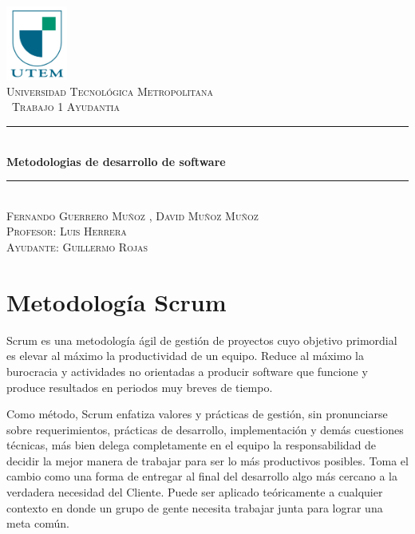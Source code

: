 \documentclass[10pt]{article}
\newcommand{\HRule}{\rule{\linewidth}{0.5mm}}
\begin{document}
\begin{titlepage}
\begin{center}
\includegraphics[width=0.15\textwidth]{Utem}~\\[1cm]

\textsc{\normalsize Universidad Tecnológica Metropolitana}\\[1.5cm]

\textsc{\ Trabajo 1 Ayudantia }\\[0.5cm]

\HRule \\[0.4cm]
{ \huge \bf Metodologias de desarrollo de software}\\[0.4cm]

\HRule \\[1.5cm]
\textsc{\large Fernando Guerrero Muñoz , David Muñoz Muñoz}\\[1cm]
\textsc{\large Profesor: Luis Herrera}\\
\textsc{\large Ayudante: Guillermo Rojas}\\
\end{center}
\end{titlepage}

\newpage

\section{Metodología Scrum}

Scrum es una metodología ágil de gestión de proyectos cuyo objetivo primordial es elevar al máximo la productividad de un equipo. Reduce al máximo la burocracia y actividades no orientadas a producir software que funcione y produce resultados en periodos muy breves de tiempo. 

Como método, Scrum enfatiza valores y prácticas de gestión, sin pronunciarse sobre requerimientos, prácticas de desarrollo, implementación y demás cuestiones técnicas, más bien delega completamente en el equipo la responsabilidad de decidir la mejor manera de trabajar para ser lo más productivos posibles. Toma el cambio como una forma de entregar al final del desarrollo algo más cercano a la verdadera necesidad del Cliente. Puede ser aplicado teóricamente a cualquier contexto en donde un grupo de gente necesita trabajar junta para lograr una meta común.
\end{document}
